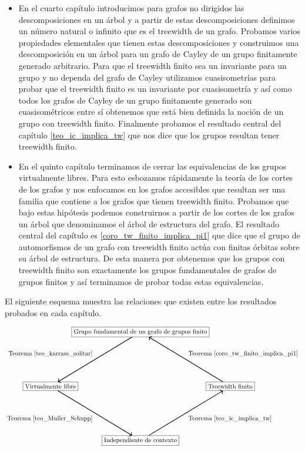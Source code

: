 \documentclass[tesis.tex]{subfiles}
\begin{document}
\begin{itemize}
			
		
		\item 
			En el cuarto capítulo introducimos para grafos no dirigidos las descomposiciones en un árbol y a partir de estas descomposiciones definimos un número natural o infinito que es el treewidth de un grafo.
			Probamos varios propiedades elementales que tienen estas descomposiciones y construimos una descomposición en un árbol para un grafo de Cayley de un grupo finitamente generado arbitrario.
			Para que el treewidth finito sea un invariante para un grupo y no dependa del grafo de Cayley utilizamos cuasisometrías para probar que el treewidth finito es un invariante por cuasisometría y así como todos los grafos de Cayley de un grupo finitamente generado son cuasisométricos entre sí obtenemos que está bien definida la noción de un grupo con treewidth finito.
			Finalmente probamos el resultado central del capítulo \ref{teo_ic_implica_tw} que nos dice que los grupos \ic resultan tener treewidth finito.
			
		\item 
			En el quinto capítulo terminamos de cerrar las equivalencias de los grupos virtualmente libres.
			Para esto esbozamos rápidamente la teoría de los cortes de los grafos y nos enfocamos en los grafos accesibles que resultan ser una familia que contiene a los grafos que tienen treewidth finito.
			Probamos que bajo estas hipótesis podemos construirnos a partir de los cortes de los grafos un árbol que denominamos el árbol de estructura del grafo.
			El resultado central del capítulo es \ref{coro_tw_finito_implica_pi1} que dice que el grupo de automorfismos de un grafo con treewidth finito actúa con finitas órbitas sobre su árbol de estructura. 
			De esta manera por obtenemos que los grupos con treewidth finito son exactamente los grupos fundamentales de grafos de grupos finitos y así terminamos de probar todas estas equivalencias.
	\end{itemize}
		
	
	
	\newpage
	El siguiente esquema muestra las relaciones que existen entre los resultados probados en cada capítulo.
	
	\[	
	\begin{tikzpicture}
		\path 
		(0,0) node(a) [rectangle,draw] {Grupo fundamental de un grafo de grupos finito}
		(5,-3) node(b) [rectangle,draw] {Treewidth finito}
		(0,-6) node(c) [rectangle,draw] {Independiente de contexto}
		(-5,-3) node (d) [rectangle,draw] {Virtualmente libre};
		\draw   
		(d) edge[<-,line width=1.0pt,"Teorema \ref{teo_karrass_solitar}"] (a) 
		(c) edge[<-,line width=1.0pt,"Teorema \ref{teo_Muller_Schupp}"] (d)
		(b) edge[<-,line width=1.0pt,"Teorema \ref{teo_ic_implica_tw}"] (c)
		(a)  edge[<-,line width=1.0pt,"Teorema \ref{coro_tw_finito_implica_pi1}"] (b);
	\end{tikzpicture}
	\]
	
\end{document}
